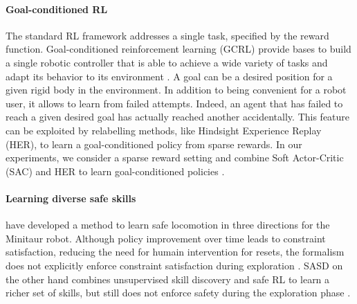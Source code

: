 \paragraph{\textbf{Goal-conditioned RL}}
The standard RL framework addresses a single task, specified by the reward function.
Goal-conditioned reinforcement learning (GCRL) provide 
bases to build a single robotic controller that is able to achieve a wide variety of tasks and
adapt its behavior to its environment \cite{Kaelbling1993LearningTA,UVFA,colas2022autotelic}.
A goal can be a desired position for a given rigid body in the environment. In addition to being convenient 
for a robot user, it allows to learn from failed attempts. Indeed, an agent that has failed to reach
a given desired goal has actually reached another accidentally.
This feature can be exploited by relabelling methods, like Hindsight Experience Replay
(HER), to learn a goal-conditioned policy from sparse rewards. 
In our experiments, we consider a sparse reward setting and combine  
Soft Actor-Critic (SAC) and HER to learn goal-conditioned policies \cite{SAC, HER}. 

\paragraph{\textbf{Learning diverse safe skills}}
\citeauthor{ha2020SACLagLevine} have developed a method to learn safe locomotion in three directions 
for the Minitaur robot. Although policy improvement over time leads to constraint satisfaction, 
reducing the need for humain intervention for resets, the formalism does not explicitly enforce constraint 
satisfaction during exploration \cite{ha2020SACLagLevine}. SASD on the other hand combines 
unsupervised skill discovery and safe RL to learn a richer set of skills, but still does not enforce safety
during the exploration phase \cite{SASD}.

